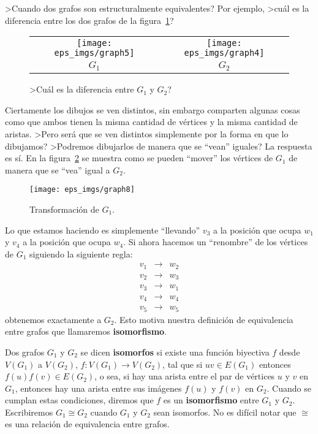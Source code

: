 >Cuando dos grafos son estructuralmente equivalentes?
Por ejemplo, >cuál es la diferencia entre los dos grafos de la figura~\ref{fig:compare-graph}?
\begin{figure}[t!]
\centering
\begin{tabular}{cc}
\texttt{[image: eps\_imgs/graph5]}\hspace*{3em} & \hspace*{3em}\texttt{[image: eps\_imgs/graph4]} \\
$G_1$ \hspace*{3em} & \hspace*{3em} $G_2$
\end{tabular}
\caption{>Cuál es la diferencia entre $G_1$ y $G_2$?}
\label{fig:compare-graph}
\end{figure}
Ciertamente los dibujos se ven distintos, sin embargo comparten algunas cosas como que ambos tienen la misma cantidad de vértices y la misma cantidad de aristas.
>Pero será que se ven distintos simplemente por la forma en que lo dibujamos?
>Podremos dibujarlos de manera que se ``vean'' iguales?
La respuesta es sí.
En la figura~\ref{fig:transform} se muestra como se pueden ``mover'' los vértices de $G_1$ de manera que se ``vea'' igual a $G_2$.
\begin{figure}[t!]
\centering
\texttt{[image: eps\_imgs/graph8]}\\
\caption{Transformación de $G_1$.}
\label{fig:transform}
\end{figure}
Lo que estamos haciendo es simplemente ``llevando'' $v_3$ a la posición que ocupa $w_1$ y $v_4$ a la posición que ocupa $w_4$.
Si ahora hacemos un ``renombre'' de los vértices de $G_1$ siguiendo la siguiente regla:
\[
\begin{array}{ccc}
v_1 & \rightarrow & w_2 \\
v_2 & \rightarrow & w_3 \\
v_3 & \rightarrow & w_1 \\
v_4 & \rightarrow & w_4 \\
v_5 & \rightarrow & w_5
\end{array}
\]
obtenemos exactamente a $G_2$.
Esto motiva nuestra definición de equivalencia entre grafos que llamaremos {\bf isomorfismo}.

\begin{definicion}
Dos grafos $G_1$ y $G_2$ se dicen {\bf isomorfos} si existe una función biyectiva $f$ desde $V(G_1)$ a $V(G_2)$, $f:V(G_1)\rightarrow V(G_2)$, tal que si $uv\in E(G_1)$ entonces $f(u)f(v)\in E(G_2)$, o sea, si hay una arista entre el par de vértices $u$ y $v$ en $G_1$, entonces hay una arista entre sus imágenes $f(u)$ y $f(v)$ en $G_2$.
Cuando se cumplan estas condiciones, diremos que $f$ es un {\bf isomorfismo} entre $G_1$ y $G_2$.
Escribiremos $G_1\cong G_2$ cuando $G_1$ y $G_2$ sean isomorfos.
No es difícil notar que $\cong$ es una relación de equivalencia entre grafos.
\end{definicion}

